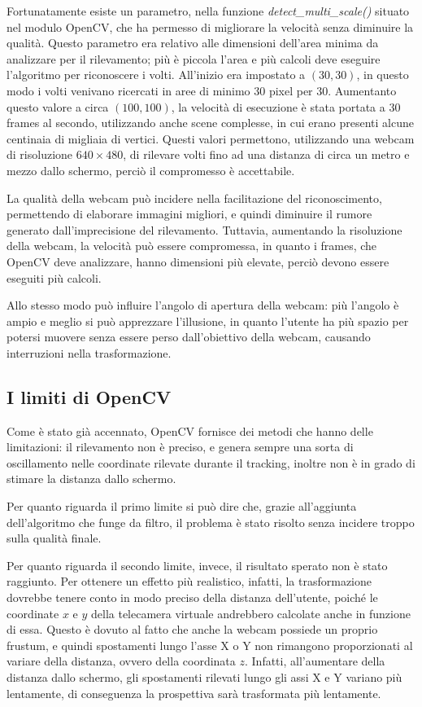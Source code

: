 Fortunatamente esiste un parametro, nella funzione \textit{detect\_multi\_scale()} situato nel modulo OpenCV, che ha permesso di migliorare la velocità senza diminuire la qualità. Questo parametro era relativo alle dimensioni dell'area minima da analizzare per il rilevamento; più è piccola l'area e più calcoli deve eseguire l'algoritmo per riconoscere i volti. All'inizio era impostato a $(30,30)$, in questo modo i volti venivano ricercati in aree di minimo 30 pixel per 30. Aumentanto questo valore a circa $(100,100)$, la velocità di esecuzione è stata portata a 30 frames al secondo, utilizzando anche scene complesse, in cui erano presenti alcune centinaia di migliaia di vertici. Questi valori permettono, utilizzando una webcam di risoluzione $640\times480$, di rilevare volti fino ad una distanza di circa un metro e mezzo dallo schermo, perciò il compromesso è accettabile.

La qualità della webcam può incidere nella facilitazione del riconoscimento, permettendo di elaborare immagini migliori, e quindi diminuire il rumore generato dall'imprecisione del rilevamento. Tuttavia, aumentando la risoluzione della webcam, la velocità può essere compromessa, in quanto i frames, che OpenCV deve analizzare, hanno dimensioni più elevate, perciò devono essere  eseguiti più calcoli.

Allo stesso modo può influire l'angolo di apertura della webcam: più l'angolo è ampio e meglio si può apprezzare l'illusione, in quanto l'utente ha più spazio per potersi muovere senza essere perso dall'obiettivo della webcam, causando interruzioni nella trasformazione. 

\subsection{I limiti di OpenCV}

Come è stato già accennato, OpenCV fornisce dei metodi che hanno delle limitazioni: il rilevamento non è preciso, e genera sempre una sorta di oscillamento nelle coordinate rilevate durante il tracking, inoltre non è in grado di stimare la distanza dallo schermo.

Per quanto riguarda il primo limite si può dire che, grazie all'aggiunta dell'algoritmo che funge da filtro, il problema è stato risolto senza incidere troppo sulla qualità finale.

Per quanto riguarda il secondo limite, invece, il risultato sperato non è stato raggiunto. Per ottenere un effetto più realistico, infatti, la trasformazione dovrebbe tenere conto in modo preciso della distanza dell'utente, poiché le coordinate $x$ e $y$ della telecamera virtuale andrebbero calcolate anche in funzione di essa. Questo è dovuto al fatto che anche la webcam possiede un proprio frustum, e quindi spostamenti lungo l'asse X o Y non rimangono proporzionati al variare della distanza, ovvero della coordinata $z$. Infatti, all'aumentare della distanza dallo schermo, gli spostamenti rilevati lungo gli assi X e Y variano più lentamente, di conseguenza la prospettiva sarà trasformata più lentamente.

